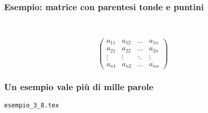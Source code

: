 \begin{frame}
  \frametitle{Esempio: matrice con parentesi tonde e puntini}
	\begin{LaTeXcode}
		\\[\n
		\alert{\\begin\{pmatrix\}}\n
		\hspace*{5ex} a\_\{11\}\ \& a\_\{12\}\ \& \\dots \& a\_\{1n\}\bs\bs\n
		\hspace*{5ex} a\_\{21\}\ \& a\_\{22\}\ \& \alert{\\dots} \& a\_\{2n\} \bs\bs\n
		\hspace*{5ex} \\vdots \& \\vdots \& \alert{\\ddots} \& \alert{\\vdots} \bs\bs\n
		\hspace*{5ex} a\_\{n1\}\ \& a\_\{n2\}\ \& \\dots \& a\_\{nn\}\bs\bs\n
		\alert{\\end\{pmatrix\}}\n
		\\]
	\end{LaTeXcode}
	\begin{LaTeXoutput}
		\[
		\begin{pmatrix}
		a_{11} & a_{12} & \dots & a_{1n} \\
		a_{21} & a_{22} & \dots & a_{2n} \\
		\vdots & \vdots & \ddots & \vdots \\
		a_{n1} & a_{n2} & \dots & a_{nn}
		\end{pmatrix}
		\]
	\end{LaTeXoutput}
\end{frame}
\begin{frame}
  \frametitle{Un esempio vale pi\`u di mille parole}
	\begin{center}
		\alert{\texttt{esempio\_3\_8.tex}}
	\end{center}
\end{frame}
